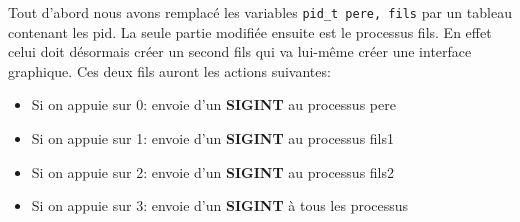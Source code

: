 Tout d'abord nous avons remplacé les variables \lstinline{pid_t pere, fils} par un tableau contenant les pid. La seule partie modifiée ensuite est le processus fils. En effet celui doit désormais créer un second fils qui va lui-même créer une interface graphique. Ces deux fils auront les actions suivantes:
\begin{itemize}
  \item Si on appuie sur 0: envoie d'un \textbf{SIGINT} au processus pere
  \item Si on appuie sur 1: envoie d'un \textbf{SIGINT} au processus fils1
  \item Si on appuie sur 2: envoie d'un \textbf{SIGINT} au processus fils2
  \item Si on appuie sur 3: envoie d'un \textbf{SIGINT} à tous les processus
\end{itemize}

\bigskip


\noindent{}